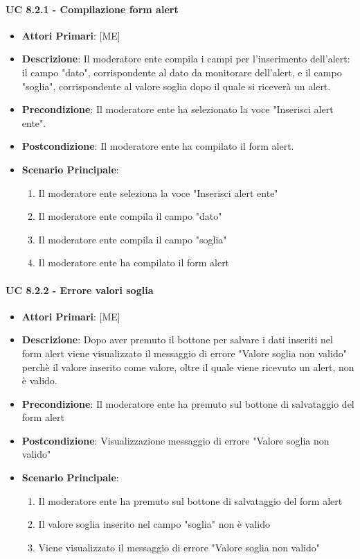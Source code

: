 			\paragraph{UC 8.2.1 - Compilazione form alert}
			\begin{itemize}
				\item \textbf{Attori Primari}: [ME]
				\item \textbf{Descrizione}: Il moderatore ente compila i campi per l'inserimento dell'alert: il campo "dato", corrispondente al dato da monitorare dell'alert, e il campo "soglia", corrispondente al valore soglia dopo il quale si riceverà un alert.
				\item \textbf{Precondizione}: Il moderatore ente ha selezionato la voce "Inserisci alert ente".
				\item \textbf{Postcondizione}: Il moderatore ente ha compilato il form alert.
				\item \textbf{Scenario Principale}:
				\begin{enumerate}
					\item{Il moderatore ente seleziona la voce "Inserisci alert ente"}
					\item{Il moderatore ente compila il campo "dato"}
					\item{Il moderatore ente compila il campo "soglia"}
					\item{Il moderatore ente ha compilato il form alert}
				\end{enumerate}	
			\end{itemize}

			\paragraph{UC 8.2.2 - Errore valori soglia}
			\begin{itemize}
				\item \textbf{Attori Primari}: [ME]
				\item \textbf{Descrizione}: Dopo aver premuto il bottone per salvare i dati inseriti nel form alert viene visualizzato il messaggio di errore "Valore soglia non valido" perchè il valore inserito come valore, oltre il quale viene ricevuto un alert, non è valido.
				\item \textbf{Precondizione}: Il moderatore ente ha premuto sul bottone di salvataggio del form alert
				\item \textbf{Postcondizione}: Visualizzazione messaggio di errore "Valore soglia non valido" 
				\item \textbf{Scenario Principale}:
				\begin{enumerate}
					\item{Il moderatore ente ha premuto sul bottone di salvataggio del form alert}
					\item{Il valore soglia inserito nel campo "soglia" non è valido}
					\item{Viene visualizzato il messaggio di errore "Valore soglia non valido" }
				\end{enumerate}
			\end{itemize}
			
